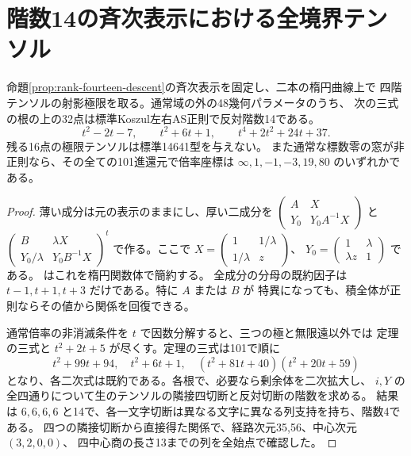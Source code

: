 \section{階数14の斉次表示における全境界テンソル}
\label{sec:rank-fourteen-boundary}
\begin{theorem}\label{thm:rank-fourteen-boundary}
命題\ref{prop:rank-fourteen-descent}の斉次表示を固定し、二本の楕円曲線上で
四階テンソルの射影極限を取る。通常域の外の48幾何パラメータのうち、
次の三式の根の上の32点は標準Koszul左右AS正則で反対階数14である。
\[
 t^2-2t-7,\qquad t^2+6t+1,\qquad t^4+2t^2+24t+37 .
\]
残る16点の極限テンソルは標準14641型を与えない。
また通常な標数零の窓が非正則なら、その全ての101進還元で倍率座標は
$\infty,1,-1,-3,19,80$ のいずれかである。
\end{theorem}
\begin{proof}
薄い成分は元の表示のままにし、厚い二成分を
$\left(\begin{smallmatrix}A&X\\Y_0&Y_0A^{-1}X\end{smallmatrix}\right)$ と
$\left(\begin{smallmatrix}B&\lambda X\\Y_0/\lambda&Y_0B^{-1}X\end{smallmatrix}\right)^t$
で作る。ここで $X=\left(\begin{smallmatrix}1&1/\lambda\\1/\lambda&z\end{smallmatrix}\right)$、
$Y_0=\left(\begin{smallmatrix}1&\lambda\\\lambda z&1\end{smallmatrix}\right)$ である。
 はこれを楕円関数体で簡約する。
全成分の分母の既約因子は $t-1,t+1,t+3$ だけである。特に $A$ または $B$ が
特異になっても、積全体が正則ならその値から関係を回復できる。

通常倍率の非消滅条件を $t$ で因数分解すると、三つの極と無限遠以外では
定理の三式と $t^2+2t+5$ が尽くす。定理の三式は101で順に
\[
 t^2+99t+94,\quad t^2+6t+1,\quad
 (t^2+81t+40)(t^2+20t+59)
\]
となり、各二次式は既約である。各根で、必要なら剰余体を二次拡大し、
$i,Y$ の全四通りについて生のテンソルの隣接四切断と反対切断の階数を求める。
結果は $6,6,6,6$ と14で、各一文字切断は異なる文字に異なる列支持を持ち、階数4である。
四つの隣接切断から直接得た関係で、経路次元35,56、中心次元 $(3,2,0,0)$、
四中心商の長さ13までの列を全始点で確認した。


\end{proof}
